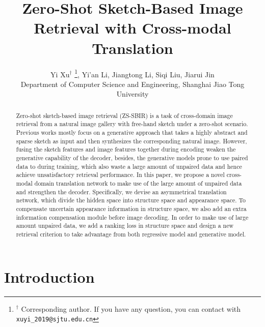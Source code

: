 \documentclass[10pt,twocolumn,letterpaper]{article}
\begin{document}
\title{Zero-Shot Sketch-Based Image Retrieval with Cross-modal Translation}

\author{Yi Xu$^{\dag}$ \thanks{$^{\dag}$ Corresponding author. If you have any question, you can contact with \tt{xuyi\_2019@sjtu.edu.cn}},  Yi'an Li, Jiangtong Li, Siqi Liu, Jiarui Jin  \\
Department of Computer Science and Engineering, Shanghai Jiao Tong University \\
}



\maketitle

\begin{abstract}
   Zero-shot sketch-based image retrieval (ZS-SBIR) is a task of cross-domain image retrieval from a natural image gallery with free-hand sketch under a zero-shot scenario. 
   Previous works mostly focus on a generative approach that takes a highly abstract and sparse sketch as input and then synthesizes the corresponding natural image. 
   However, fusing the sketch features and image features together during encoding weaken the generative capability of the decoder, besides, the generative models prone to use paired data to during training, which also waste a large amount of unpaired data and hence achieve unsatisfactory retrieval performance. 
   In this paper, we propose a novel cross-modal domain translation network to make use of the large amount of unpaired data and strengthen the decoder. 
   Specifically, we devise an asymmetrical translation network, which divide the hidden space into structure space and appearance space. To compensate uncertain appearance information in structure space, we also add an extra information compensation module before image decoding.
   In order to make use of large amount unpaired data, we add a ranking loss in structure space and design a new retrieval criterion to take advantage from both regressive model and generative model.
\end{abstract}

\section{Introduction}
\end{document}
